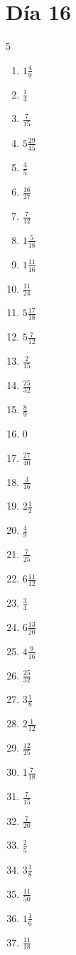 \documentclass[12pt]{article}
\begin{document}
\section*{Día 16}
\begin{multicols}{5}\begin{enumerate}
\item $ 1 \frac{4}{9} $
\item $ \frac{1}{4} $
\item $ \frac{7}{15} $
\item $ 5 \frac{29}{45} $
\item $ \frac{4}{5} $
\item $ \frac{16}{27} $
\item $ \frac{7}{12} $
\item $ 1 \frac{5}{18} $
\item $ 1 \frac{11}{16} $
\item $ \frac{11}{24} $
\item $ 5 \frac{17}{18} $
\item $ 5 \frac{7}{12} $
\item $ \frac{2}{15} $
\item $ \frac{25}{32} $
\item $ \frac{8}{9} $
\item $ 0 $
\item $ \frac{27}{40} $
\item $ \frac{3}{16} $
\item $ 2 \frac{1}{2} $
\item $ \frac{4}{9} $
\item $ \frac{7}{25} $
\item $ 6 \frac{11}{12} $
\item $ \frac{3}{4} $
\item $ 6 \frac{13}{20} $
\item $ 4 \frac{9}{16} $
\item $ \frac{25}{32} $
\item $ 3 \frac{1}{8} $
\item $ 2 \frac{1}{12} $
\item $ \frac{12}{25} $
\item $ 1 \frac{7}{18} $
\item $ \frac{7}{15} $
\item $ \frac{7}{20} $
\item $ \frac{2}{5} $
\item $ 3 \frac{1}{8} $
\item $ \frac{11}{50} $
\item $ 1 \frac{1}{6} $
\item $ \frac{11}{18} $

\end{enumerate}
\end{multicols}
\end{document}
